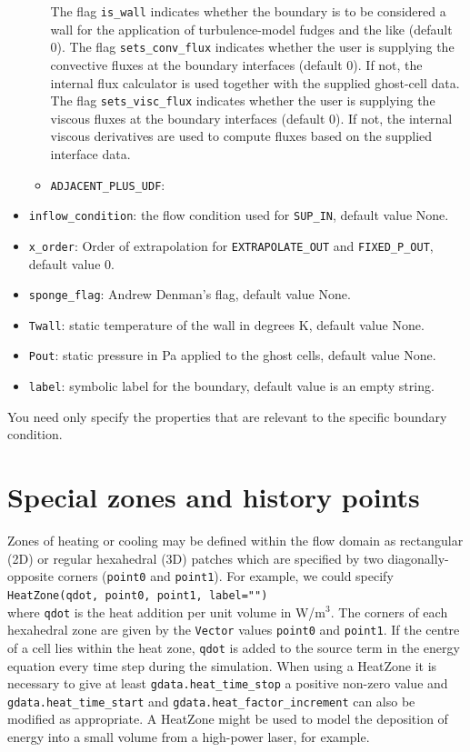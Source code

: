 \begin{itemize}
\begin{itemize}
        The flag \texttt{is\_wall} indicates whether the boundary is to be considered
        a wall for the application of turbulence-model fudges and the like (default 0).
        The flag \texttt{sets\_conv\_flux} indicates whether the user is supplying
        the convective fluxes at the boundary interfaces (default 0).  
        If not, the internal flux calculator is used together with the supplied ghost-cell data.
        The flag \texttt{sets\_visc\_flux} indicates whether the user is supplying
        the viscous fluxes at the boundary interfaces (default 0).  
        If not, the internal viscous derivatives are used to compute fluxes based on the supplied interface data.
      \item \texttt{ADJACENT\_PLUS\_UDF}:
    \end{itemize}
  \item \texttt{inflow\_condition}: the flow condition used for
    \texttt{SUP\_IN}, default value None.
  \item \texttt{x\_order}: Order of extrapolation for \texttt{EXTRAPOLATE\_OUT} and 
    \texttt{FIXED\_P\_OUT}, default value 0.
  \item \texttt{sponge\_flag}: Andrew Denman's flag, default value None.
  \item \texttt{Twall}: static temperature of the wall in degrees K, default value None.
  \item \texttt{Pout}: static pressure in Pa applied to the ghost cells, default value None.
  \item \texttt{label}: symbolic label for the boundary, default value is an empty string.
\end{itemize}
You need only specify the properties that are relevant to the specific
boundary condition.

\bigskip
\section{Special zones and history points}
\label{sec:special-zones}
% 
Zones of heating or cooling may be defined within the flow domain as rectangular (2D) 
or regular hexahedral (3D) patches which are specified by two diagonally-opposite
corners (\texttt{point0} and \texttt{point1}).
For example, we could specify\\
\texttt{HeatZone(qdot, point0, point1, label="")}\\
where \texttt{qdot} is the heat addition per unit volume in W/m$^3$.
The corners of each hexahedral zone are given by the \texttt{Vector} values 
\texttt{point0} and \texttt{point1}.
If the centre of a cell lies within the heat zone, \texttt{qdot} is added to
the source term in the energy equation every time step during the simulation. When using
a HeatZone it is necessary to give at least \texttt{gdata.heat\_time\_stop} a positive non-zero
value and \texttt{gdata.heat\_time\_start} and \texttt{gdata.heat\_factor\_increment} can also be modified
as appropriate.
A HeatZone might be used to model the deposition of energy into a small volume from 
a high-power laser, for example.

